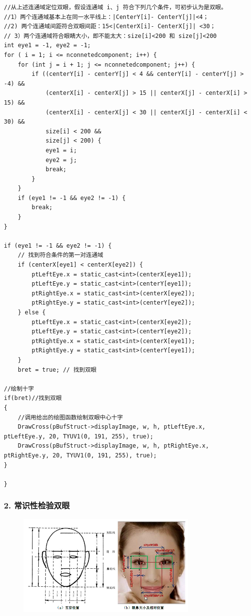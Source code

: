 \documentclass[12pt,hyperref,a4paper,UTF8]{ctexart}
\begin{document}
        \begin{lstlisting}[caption={初步定位双眼}, label={lst:example}]
//从上述连通域定位双眼，假设连通域 i、j 符合下列几个条件，可初步认为是双眼。
//1）两个连通域基本上在同一水平线上：|CenterY[i]- CenterY[j]|<4；
//2) 两个连通域间距符合双眼间距：15<|CenterX[i]- CenterX[j]| <30；
// 3）两个连通域符合眼睛大小，即不能太大：size[i]<200 和 size[j]<200
int eye1 = -1, eye2 = -1;
for ( i = 1; i <= nconnetedcomponent; i++) {
    for (int j = i + 1; j <= nconnetedcomponent; j++) {
        if ((centerY[i] - centerY[j] < 4 && centerY[i] - centerY[j] > -4) && 
            (centerX[i] - centerX[j] > 15 || centerX[j] - centerX[i] > 15) && 
            (centerX[i] - centerX[j] < 30 || centerX[j] - centerX[i] < 30) && 
            size[i] < 200 && 
            size[j] < 200) {
            eye1 = i;
            eye2 = j;
            break;
        }
    }
    if (eye1 != -1 && eye2 != -1) {
        break;
    }
}

if (eye1 != -1 && eye2 != -1) {
    // 找到符合条件的第一对连通域
    if (centerX[eye1] < centerX[eye2]) {
        ptLeftEye.x = static_cast<int>(centerX[eye1]);
        ptLeftEye.y = static_cast<int>(centerY[eye1]);
        ptRightEye.x = static_cast<int>(centerX[eye2]);
        ptRightEye.y = static_cast<int>(centerY[eye2]);
    } else {
        ptLeftEye.x = static_cast<int>(centerX[eye2]);
        ptLeftEye.y = static_cast<int>(centerY[eye2]);
        ptRightEye.x = static_cast<int>(centerX[eye1]);
        ptRightEye.y = static_cast<int>(centerY[eye1]);
    }
    bret = true; // 找到双眼

//绘制十字
if(bret)//找到双眼
{
    //调用给出的绘图函数绘制双眼中心十字
    DrawCross(pBufStruct->displayImage, w, h, ptLeftEye.x, ptLeftEye.y, 20, TYUV1(0, 191, 255), true);
    DrawCross(pBufStruct->displayImage, w, h, ptRightEye.x, ptRightEye.y, 20, TYUV1(0, 191, 255), true);
}

}
        \end{lstlisting}



        \subsubsection*{\large \textbf{2. 常识性检验双眼}}


\begin{figure}[H]
    \centering
    \includegraphics[width=0.8\textwidth]{./figures/fig/image9.png}
    \label{fig:your_image_label}
\end{figure}
\end{document}
